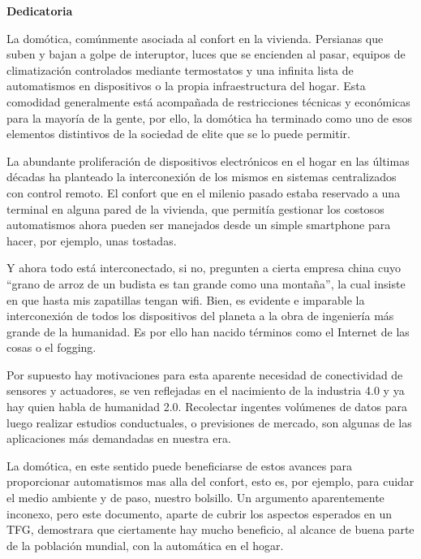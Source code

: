 
\newpage
\begin{center}
{\bf \Huge Dedicatoria}
\end{center}
\vspace{1cm}
\setlength{\baselineskip}{0.8cm}


La domótica, comúnmente asociada al confort en la vivienda. Persianas que suben y bajan a golpe de interuptor, luces que se encienden al pasar, equipos de climatización controlados mediante termostatos y una infinita lista de automatismos en dispositivos o la propia infraestructura del hogar. Esta comodidad generalmente está acompañada de restricciones técnicas y económicas para la mayoría de la gente, por ello, la domótica ha terminado como uno de esos elementos distintivos de la sociedad de elite que se lo puede permitir.

La abundante proliferación de dispositivos electrónicos en el hogar en las últimas décadas ha planteado la interconexión de los mismos en sistemas centralizados con control remoto. El confort que en el milenio pasado estaba reservado a una terminal en alguna pared de la vivienda, que permitía gestionar los costosos automatismos ahora pueden ser manejados desde un simple smartphone para hacer, por ejemplo, unas tostadas.

Y ahora todo está interconectado, si no, pregunten a cierta empresa china cuyo “grano de arroz de un budista es tan grande como una montaña”, la cual insiste en que hasta mis zapatillas tengan wifi. Bien, es evidente e imparable la interconexión de todos los dispositivos del planeta a la obra de ingeniería más grande de la humanidad. Es por ello han nacido términos como el Internet de las cosas o el fogging.

Por supuesto hay motivaciones para esta aparente necesidad de conectividad de sensores y actuadores, se ven reflejadas en el nacimiento de la industria 4.0 y ya hay quien habla de humanidad 2.0. Recolectar ingentes volúmenes de datos para luego realizar estudios conductuales, o previsiones de mercado, son algunas de las aplicaciones más demandadas en nuestra era.

La domótica, en este sentido puede beneficiarse de estos avances para proporcionar automatismos mas alla del confort, esto es, por ejemplo, para cuidar el medio ambiente y de paso, nuestro bolsillo. Un argumento aparentemente inconexo, pero este documento, aparte de cubrir los aspectos esperados en un TFG, demostrara que ciertamente hay mucho beneficio, al alcance de buena parte de la población mundial, con la automática en el hogar.
